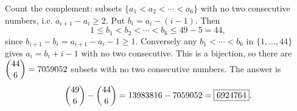 Count the complement: subsets $\{a_1<a_2<\cdots<a_6\}$ with no two consecutive numbers, i.e. $a_{i+1}-a_i\ge2$. Put $b_i=a_i-(i-1)$. Then
\[1\le b_1<b_2<\cdots<b_6\le49-5=44,\]
since $b_{i+1}-b_i=a_{i+1}-a_i-1\ge1$. Conversely any $b_1<\cdots<b_6$ in $\{1,\dots,44\}$ gives $a_i=b_i+i-1$ with no two consecutive. This is a bijection, so there are $\dbinom{44}{6}=7059052$ subsets with no two consecutive numbers. The answer is
\[\dbinom{49}{6}-\dbinom{44}{6}=13983816-7059052=\boxed{6924764}.\]
